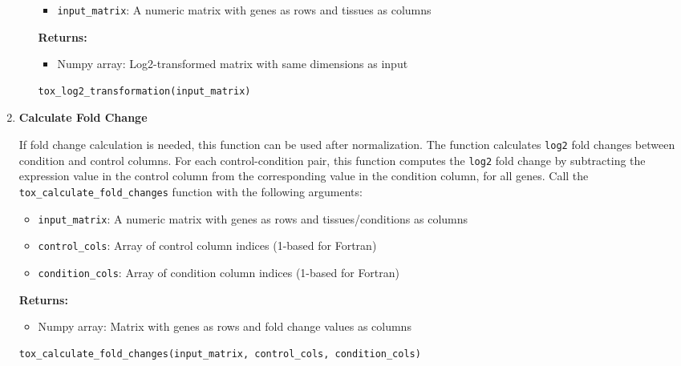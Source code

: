 \begin{enumerate}
\begin{enumerate}
                  \begin{itemize}
                    \item \texttt{input\_matrix}: A numeric matrix with genes as rows and
                          tissues as columns
                  \end{itemize}
                  
                  \textbf{Returns:}
                  \begin{itemize}
                    \item Numpy array: Log2-transformed matrix with same dimensions as
                          input
                  \end{itemize}
                  \begin{lstlisting}[language=Python, caption={Python Log2 Transformation}]
tox_log2_transformation(input_matrix)
                  \end{lstlisting}
          \end{enumerate}
          
    \item \textbf{Calculate Fold Change}
          
          If fold change calculation is needed, this function can be used after
          normalization. The function calculates \texttt{log2} fold changes between
          condition and control columns. For each control-condition pair, this
          function computes the \texttt{log2} fold change by subtracting the expression
          value in the control column from the corresponding value in the condition column,
          for all genes. Call the \texttt{tox\_calculate\_fold\_changes} function
          with the following arguments:
          
          \begin{itemize}
            \item \texttt{input\_matrix}: A numeric matrix with genes as rows and tissues/conditions
                  as columns
                  
            \item \texttt{control\_cols}: Array of control column indices (1-based
                  for Fortran)
                  
            \item \texttt{condition\_cols}: Array of condition column indices (1-based
                  for Fortran)
          \end{itemize}
          
          \textbf{Returns:}
          \begin{itemize}
            \item Numpy array: Matrix with genes as rows and fold change values as
                  columns
          \end{itemize}
          
          \begin{lstlisting}[language=Python, caption={Python Fold Change Calculation}]
tox_calculate_fold_changes(input_matrix, control_cols, condition_cols)
          \end{lstlisting}
\end{enumerate}